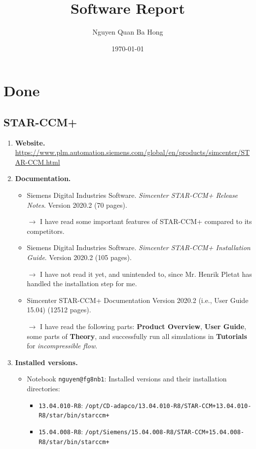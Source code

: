 \documentclass[onsided]{book}
\title{Software Report}
\author{Nguyen Quan Ba Hong}
\date{\today}
\numberwithin{equation}{section}
\begin{document}
\maketitle
\setcounter{secnumdepth}{6}
\setcounter{tocdepth}{6}
\tableofcontents


\chapter{Done}

\section{STAR-CCM+}
\begin{enumerate}
    \item \textbf{Website.} \url{https://www.plm.automation.siemens.com/global/en/products/simcenter/STAR-CCM.html}
    \item \textbf{Documentation.}
    \begin{itemize}
        \item Siemens Digital Industries Software. \textit{Simcenter STAR-CCM+ Release Notes}. Version 2020.2 (70 pages).
        
        $\to$ I have read some important features of STAR-CCM+ compared to its competitors.
        \item Siemens Digital Industries Software. \textit{Simcenter STAR-CCM+ Installation Guide}. Version 2020.2 (105 pages).
        
        $\to$ I have not read it yet, and unintended to, since Mr. Henrik Pletat has handled the installation step for me.
        \item Simcenter STAR-CCM+ Documentation Version 2020.2 (i.e., User Guide 15.04) (12512 pages).
        
        $\to$ I have read the following parts: \textbf{Product Overview}, \textbf{User Guide}, some parts of \textbf{Theory}, and successfully run all simulations in \textbf{Tutorials} for \textit{incompressible flow}.
    \end{itemize}
    \item \textbf{Installed versions.}
    \begin{itemize}
        \item Notebook \texttt{nguyen@fg8nb1}: Installed versions and their installation directories:
        \begin{itemize}
            \item \texttt{13.04.010-R8}: \verb|/opt/CD-adapco/13.04.010-R8/STAR-CCM+13.04.010-R8/star/bin/starccm+|
            \item \texttt{15.04.008-R8}: \verb|/opt/Siemens/15.04.008-R8/STAR-CCM+15.04.008-R8/star/bin/starccm+|
        \end{itemize}
    

\end{itemize}
\end{enumerate}
\end{document}
